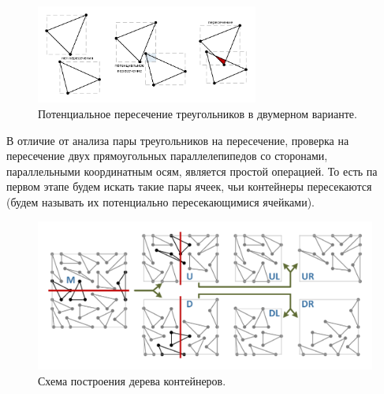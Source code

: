 \begin{figure}[ht]
\centering
\includegraphics[width=0.65\textwidth]{pics/text_1_int/containers.pdf}
\singlespacing
{}\caption{Потенциальное пересечение треугольников в двумерном варианте.}\label{fig:text_1_int_containers}
\end{figure}

В отличие от анализа пары треугольников на пересечение, проверка на пересечение двух прямоугольных параллелепипедов со сторонами, параллельными координатным осям, является простой операцией.
То есть па первом этапе будем искать такие пары ячеек, чьи контейнеры пересекаются (будем называть их потенциально пересекающимися ячейками).

\begin{figure}[ht]
\centering
\includegraphics[width=1.0\textwidth]{pics/text_1_int/pic_box.pdf}
\singlespacing
{}\caption{Схема построения дерева контейнеров.}\label{fig:text_1_int_box_tree}
\end{figure}

